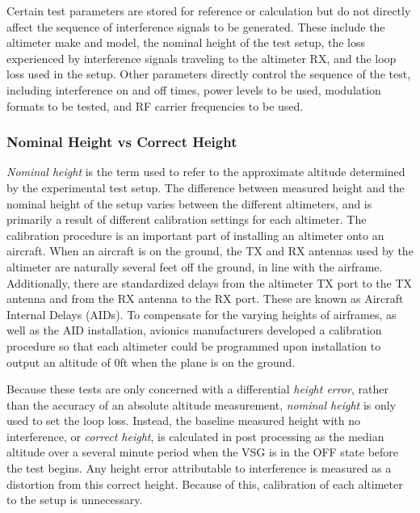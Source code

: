 Certain test parameters are stored for reference or calculation but do not directly affect the sequence of interference signals to be generated. These include the altimeter make and model, the nominal height of the test setup, the loss experienced by interference signals traveling to the altimeter RX, and the loop loss used in the setup. Other parameters directly control the sequence of the test, including interference on and off times, power levels to be used, modulation formats to be tested, and RF carrier frequencies to be used. 

\subsubsection{Nominal Height vs Correct Height}\label{subsub:nominal}
\textit{Nominal height} is the term used to refer to the approximate altitude determined by the experimental test setup. The difference between measured height and the nominal height of the setup varies between the different altimeters, and is primarily a result of different calibration settings for each altimeter. The calibration procedure is an important part of installing an altimeter onto an aircraft. When an aircraft is on the ground, the TX and RX antennas used by the altimeter are naturally several feet off the ground, in line with the airframe. Additionally, there are standardized delays from the altimeter TX port to the TX antenna and from the RX antenna to the RX port. These are known as Aircraft Internal Delays (AIDs). To compensate for the varying heights of airframes, as well as the AID installation, avionics manufacturers developed a calibration procedure so that each altimeter could be programmed upon installation to output an altitude of 0ft when the plane is on the ground. 

Because these tests are only concerned with a differential \textit{height error}, rather than the accuracy of an absolute altitude measurement, \textit{nominal height} is only used to set the loop loss. Instead, the baseline measured height with no interference, or \textit{correct height}, is calculated in post processing as the median altitude over a several minute period when the VSG is in the OFF state before the test begins. Any height error attributable to interference is measured as a distortion from this correct height. Because of this, calibration of each altimeter to the setup is unnecessary. 

